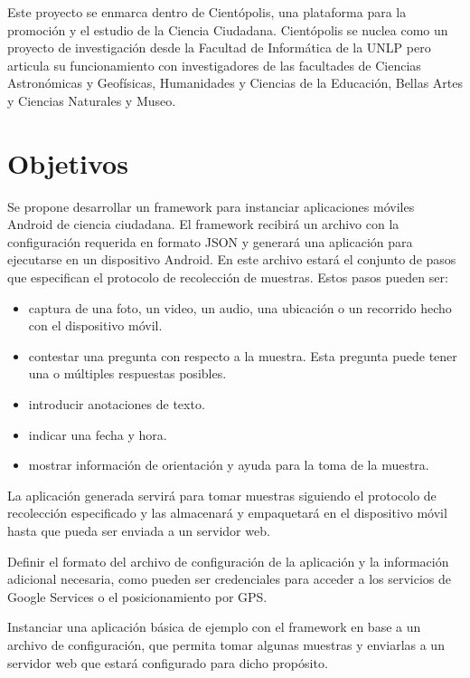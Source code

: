 Este proyecto se enmarca dentro de Cientópolis\cite{cientopolis}, una plataforma para la promoción y el estudio de la Ciencia Ciudadana. Cientópolis se nuclea como un proyecto de investigación desde la Facultad de Informática de la UNLP pero articula su funcionamiento con investigadores de las facultades de Ciencias Astronómicas y Geofísicas, Humanidades y Ciencias de la Educación, Bellas Artes y Ciencias Naturales y Museo.

\section{ Objetivos }\label{sec:objetivos}		
		
Se propone desarrollar un framework para instanciar aplicaciones móviles Android de ciencia ciudadana. El framework recibirá un archivo con la configuración requerida en formato JSON y generará una aplicación para ejecutarse en un dispositivo Android. En este archivo estará el conjunto de pasos que especifican el protocolo de recolección de muestras. Estos pasos pueden ser:
			\begin{itemize}
				\item captura de una foto, un video, un audio, una ubicación o un recorrido hecho con el dispositivo móvil.
				\item contestar una pregunta con respecto a la muestra. Esta pregunta puede tener una o múltiples respuestas posibles.
				\item introducir anotaciones de texto.
				\item indicar una fecha y hora.
				\item mostrar información de orientación y ayuda para la toma de la muestra.
			\end{itemize}

La aplicación generada servirá para tomar muestras siguiendo el protocolo de recolección especificado y las almacenará y empaquetará en el dispositivo móvil hasta que pueda ser enviada a un servidor web.
		
Definir el formato del archivo de configuración de la aplicación y la información adicional necesaria, como pueden ser credenciales para acceder a los servicios de Google Services o el posicionamiento por GPS.

Instanciar una aplicación básica de ejemplo con el framework en base a un archivo de configuración, que permita tomar algunas muestras y enviarlas a un servidor web que estará configurado para dicho propósito.

